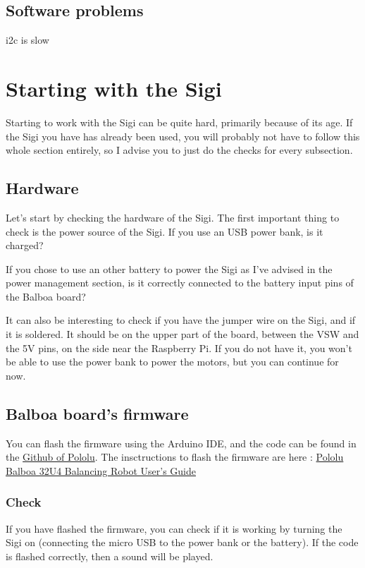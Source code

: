 \documentclass{article}
\begin{document}
\subsection{Software problems}

i2c is slow


\section{Starting with the Sigi}

Starting to work with the Sigi can be quite hard, primarily because of its age.
If the Sigi you have has already been used, you will probably not have to follow this whole
section entirely, so I advise you to just do the checks for every subsection.

\subsection{Hardware}

Let's start by checking the hardware of the Sigi.
The first important thing to check is the power source of the Sigi.
If you use an USB power bank, is it charged?

If you chose to use an other battery to power the Sigi as I've advised in the power management
section, is it correctly connected to the battery input pins of the Balboa board?

It can also be interesting to check if you have the jumper wire on the Sigi, and if it is soldered.
It should be on the upper part of the board, between the VSW and the 5V pins, on the side near the
Raspberry Pi. If you do not have it, you won't be able to use the power bank to power the motors,
but you can continue for now.

\subsection{Balboa board's firmware}

You can flash the firmware using the Arduino IDE, and the code can be found in the
\href{https://github.com/pololu/pololu-rpi-slave-arduino-library/blob/master/examples/
AStarRPiSlaveDemo/AStarRPiSlaveDemo.ino}{Github of Pololu}.
The insctructions to flash the firmware are here : \href{https://www.pololu.com/
docs/pdf/0J70/balboa_32u4_robot.pdf}{Pololu Balboa 32U4 Balancing Robot User's Guide}

\subsubsection{Check}
If you have flashed the firmware, you can check if it is working by turning the Sigi on
(connecting the micro USB to the power bank or the battery). If the code is flashed correctly, then
a sound will be played.
\end{document}
